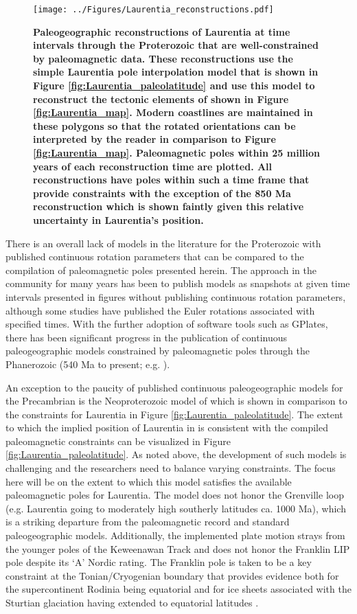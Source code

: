 \documentclass[11pt,letterpaper]{article}
\begin{document}
\begin{figure}
\centering
\texttt{[image: ../Figures/Laurentia\_reconstructions.pdf]}
\caption{\small{\textbf{Paleogeographic reconstructions of Laurentia at time intervals through the Proterozoic that are well-constrained by paleomagnetic data. These reconstructions use the simple Laurentia pole interpolation model that is shown in Figure \ref{fig:Laurentia_paleolatitude} and use this model to reconstruct the tectonic elements of \cite{Whitmeyer2007a} shown in Figure \ref{fig:Laurentia_map}. Modern coastlines are maintained in these polygons so that the rotated orientations can be interpreted by the reader in comparison to Figure \ref{fig:Laurentia_map}. Paleomagnetic poles within 25 million years of each reconstruction time are plotted. All reconstructions have poles within such a time frame that provide constraints with the exception of the 850 Ma reconstruction which is shown faintly given this relative uncertainty in Laurentia's position.}}}
\label{fig:Laurentia_reconstructions}
\end{figure} 

There is an overall lack of models in the literature for the Proterozoic with published continuous rotation parameters that can be compared to the compilation of paleomagnetic poles presented herein. The approach in the community for many years has been to publish models as snapshots at given time intervals presented in figures without publishing continuous rotation parameters, although some studies have published the Euler rotations associated with specified times. With the further adoption of software tools such as GPlates, there has been significant progress in the publication of continuous paleogeographic models constrained by paleomagnetic poles through the Phanerozoic (540 Ma to present; e.g. \citealp{Torsvik2012a}).
 
An exception to the paucity of published continuous paleogeographic models for the Precambrian is the Neoproterozoic model of \cite{Merdith2017b} which is shown in comparison to the constraints for Laurentia in Figure \ref{fig:Laurentia_paleolatitude}. The extent to which the implied position of Laurentia in \cite{Merdith2017b} is consistent with the compiled paleomagnetic constraints can be visualized in Figure \ref{fig:Laurentia_paleolatitude}. As noted above, the development of such models is challenging and the researchers need to balance varying constraints. The focus here will be on the extent to which this model satisfies the available paleomagnetic poles for Laurentia. The model does not honor the Grenville loop (e.g. Laurentia going to moderately high southerly latitudes ca. 1000 Ma), which is a striking departure from the paleomagnetic record and standard paleogeographic models. Additionally, the implemented plate motion strays from the younger poles of the Keweenawan Track and does not honor the Franklin LIP pole \cite{Denyszyn2009b} despite its `A' Nordic rating. The Franklin pole is taken to be a key constraint at the Tonian/Cryogenian boundary that provides evidence both for the supercontinent Rodinia being equatorial and for ice sheets associated with the Sturtian glaciation having extended to equatorial latitudes \citep{Macdonald2010a}.
\end{document}
